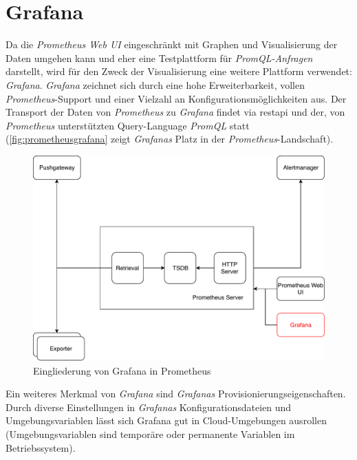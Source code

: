 \documentclass[titlepage]{report}
\begin{document}
\section*{Grafana}
Da die \emph{Prometheus Web UI} eingeschränkt mit Graphen und
Visualisierung der Daten umgehen kann und eher eine Testplattform für
\emph{PromQL-Anfragen} darstellt, wird für den Zweck der
Visualisierung eine weitere Plattform verwendet:
\emph{Grafana}\cite{GRAFANA}. \emph{Grafana} zeichnet sich durch eine
hohe Erweiterbarkeit, vollen \emph{Prometheus}\hyp{}Support und einer
Vielzahl an Konfigurationsmöglichkeiten aus. Der Transport der Daten von
\emph{Prometheus} zu \emph{Grafana} findet via \gls{restapi} und der, von
\emph{Prometheus} unterstützten Query\hyp{}Language \emph{PromQL} statt
(\autoref{fig:prometheusgrafana} zeigt \emph{Grafanas} Platz in der
\emph{Prometheus}\hyp{}Landschaft).
\begin{figure}[H]
    \centering
    \includegraphics[width=1.0\textwidth]{figures/prometheus_grafana.pdf}
    \caption{Eingliederung von Grafana in Prometheus}\label{fig:prometheusgrafana}
\end{figure}
Ein weiteres Merkmal von \emph{Grafana} sind \emph{Grafanas}
Provisionierungseigenschaften. Durch diverse Einstellungen in
\emph{Grafanas} Konfigurationsdateien und Umgebungsvariablen lässt sich
Grafana gut in Cloud\hyp{}Umgebungen ausrollen (Umgebungsvariablen sind
temporäre oder permanente Variablen im Betriebssystem).
\end{document}
